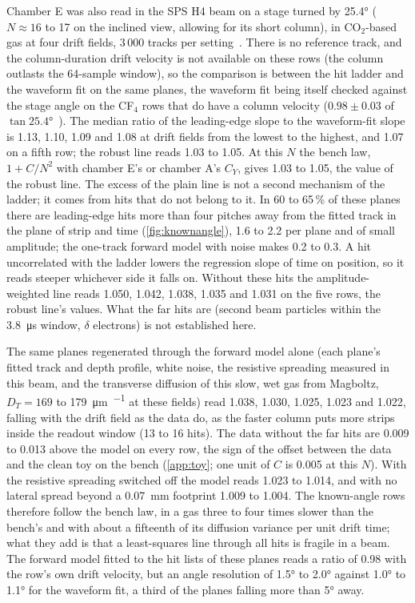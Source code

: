 Chamber E was also read in the SPS H4 beam on a stage turned by \ang{25.4} ($N \approx 16$ to 17 on the inclined view, allowing for its short column), in CO$_2$-based
gas at four drift fields, 3\,000 tracks per setting~\cite{paperI}. There is no reference track, and the column-duration drift
velocity is not available on these rows (the column outlasts the 64-sample window), so the comparison is between the hit
ladder and the waveform fit on the same planes, the waveform fit being itself checked against the stage angle
on the CF$_4$ rows that do have a column velocity ($0.98 \pm 0.03$ of $\tan\ang{25.4}$~\cite{paperI}). The median ratio of the leading-edge slope to the waveform-fit slope is
1.13, 1.10, 1.09 and 1.08 at drift fields from the lowest to the highest, and 1.07 on a fifth row; the robust line reads 1.03 to
1.05. At this $N$ the bench law, $1 + C/N^2$ with chamber E's or chamber A's $C_Y$, gives 1.03 to 1.05, the value of the robust
line. The excess of the plain line is not a second mechanism of the ladder; it comes from hits that do not belong to it. In 60
to 65\,\% of these planes there are leading-edge hits more than four pitches away from the fitted track in the plane of strip
and time (\cref{fig:knownangle}), 1.6 to 2.2 per plane and of small amplitude; the one-track forward model with noise makes 0.2
to 0.3. A hit uncorrelated with the ladder lowers the regression slope of time on position, so it reads steeper whichever side
it falls on. Without these hits the amplitude-weighted line reads 1.050, 1.042, 1.038, 1.035 and 1.031 on the five rows, the
robust line's values. What the far hits are (second beam particles within the \SI{3.8}{\micro\second} window, $\delta$ electrons)
is not established here.

The same planes regenerated through the forward model alone (each plane's fitted track and depth profile, white noise, the
resistive spreading measured in this beam, and the transverse diffusion of this slow, wet gas from Magboltz,
$D_T = 169$ to \SI{179}{\micro\metre\per{}} at these fields) read 1.038, 1.030, 1.025, 1.023 and
1.022, falling with the drift field as the data do, as the faster column puts more strips inside the readout window (13 to 16
hits). The data without the far hits are 0.009 to 0.013 above the model on every row, the sign of the offset between
the data and the clean toy on the bench (\cref{app:toy}; one unit of $C$ is 0.005 at this $N$). With the resistive spreading switched off the
model reads 1.023 to 1.014, and with no lateral spread beyond a \SI{0.07}{mm} footprint 1.009 to 1.004. The known-angle rows
therefore follow the bench law, in a gas three to four times slower than the bench's and with about a fifteenth of its diffusion
variance per unit drift time; what they add is that a least-squares line through all hits is fragile in a beam. The forward model fitted to the hit lists of these planes reads a ratio of 0.98 with the row's own drift velocity,
but an angle resolution of \ang{1.5} to \ang{2.0} against \ang{1.0} to \ang{1.1} for the waveform fit, a third of the planes falling
more than \ang{5} away.

